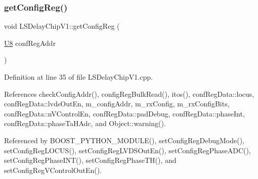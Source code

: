 \subsubsection{\texorpdfstring{get\+Config\+Reg()}{getConfigReg()}}
{\footnotesize\ttfamily void L\+S\+Delay\+Chip\+V1\+::get\+Config\+Reg (\begin{DoxyParamCaption}\item[{\hyperlink{ICECALv3_8h_a3cb25ca6f51f003950f9625ff05536fc}{U8}}]{conf\+Reg\+Addr }\end{DoxyParamCaption})}



Definition at line 35 of file L\+S\+Delay\+Chip\+V1.\+cpp.



References check\+Config\+Addr(), config\+Reg\+Bulk\+Read(), itos(), conf\+Reg\+Data\+::locus, conf\+Reg\+Data\+::lvds\+Out\+En, m\+\_\+config\+Addr, m\+\_\+rx\+Config, m\+\_\+rx\+Config\+Bits, conf\+Reg\+Data\+::n\+V\+Control\+En, conf\+Reg\+Data\+::pad\+Debug, conf\+Reg\+Data\+::phase\+Int, conf\+Reg\+Data\+::phase\+Ta\+H\+Adc, and Object\+::warning().



Referenced by B\+O\+O\+S\+T\+\_\+\+P\+Y\+T\+H\+O\+N\+\_\+\+M\+O\+D\+U\+L\+E(), set\+Config\+Reg\+Debug\+Mode(), set\+Config\+Reg\+L\+O\+C\+U\+S(), set\+Config\+Reg\+L\+V\+D\+S\+Out\+En(), set\+Config\+Reg\+Phase\+A\+D\+C(), set\+Config\+Reg\+Phase\+I\+N\+T(), set\+Config\+Reg\+Phase\+T\+H(), and set\+Config\+Reg\+V\+Control\+Out\+En().


